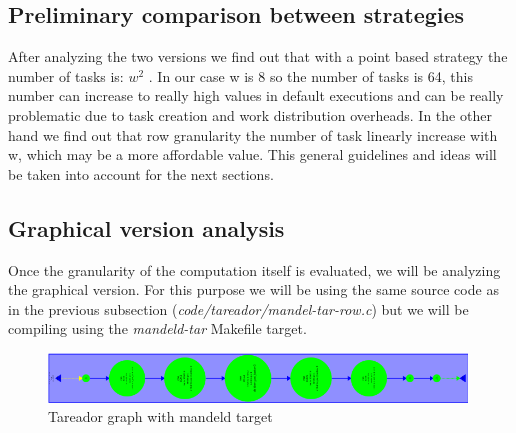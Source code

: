 \documentclass{article}
\begin{document}
\subsection{Preliminary comparison between strategies}
\begin{flushleft}
After analyzing the two versions we find out that with a point based strategy the number of tasks is: $w^2$ . In our case w is 8 so the number of tasks is 64, this number can increase to really high values in default executions and can be really problematic due to task creation and work distribution overheads. In the other hand we find out that row granularity the number of task linearly increase with w, which may be a more affordable value. This general guidelines and ideas will be taken into account for the next sections.
\end{flushleft}
\subsection{Graphical version analysis}
\label{sec:graphical}
\begin{flushleft}
Once the granularity of the computation itself is evaluated, we will be analyzing the graphical version. For this purpose we will be using the same source code as in the previous subsection (\textit{code/tareador/mandel-tar-row.c}) but we will be compiling using the \textit{mandeld-tar} Makefile target. 
\end{flushleft}

\begin{figure}[ht]
    \centering
    \includegraphics[width=0.99\textwidth]{r-mandeld.png}
    \caption{Tareador graph with mandeld target}
    \label{fig:tareadormandeld}
\end{figure}
\end{document}
